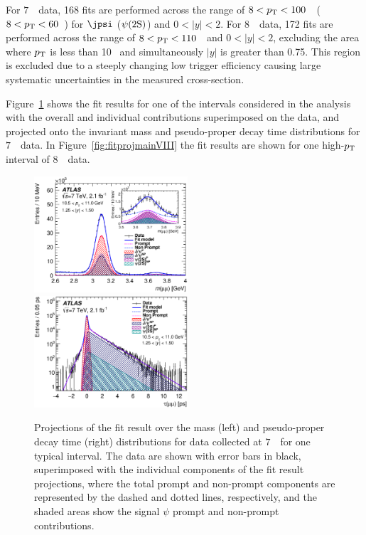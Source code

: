 For $7$~\TeV\ data, 168 fits are performed across the range of $8<\mbox{$p_{\text{T}}$}<100$~\GeV\ ($8<\mbox{$p_{\text{T}}$}<60$~\GeV) for $\jpsi$ ($\psi(2\mathrm{S})$) and $0<|y|<2$.
For $8$~\TeV\ data, 172 fits are performed across the range of $8<\mbox{$p_{\text{T}}$}<110$~\GeV\ and $0<|y|<2$,
excluding the area where $\mbox{$p_{\text{T}}$}$ is less than 10 \GeV\ and simultaneously $|y|$ is
greater than 0.75. This region is excluded due to a steeply changing low trigger efficiency 
causing large systematic uncertainties in the measured cross-section.

Figure~\ref{fig:fitprojmain} shows the fit results for one of the intervals considered in the analysis with the overall and individual contributions superimposed on the data, and projected onto the invariant mass and pseudo-proper decay time distributions for  $7$~\TeV\ data.
In Figure~\ref{fig:fitprojmainVIII} the fit results are shown for one high-$\mbox{$p_{\text{T}}$}$ interval of $8$~\TeV\  data.

\begin{figure} [!ht]
  \begin{center} 
   \includegraphics[width=0.51\textwidth]{figures/c_c_Mass_5_5.eps}
   \hspace{-0.55cm}
   \includegraphics[width=0.51\textwidth]{figures/c_c_Tau_5_5.eps}
      \caption{Projections of the fit result over the mass (left) and pseudo-proper decay time (right) distributions for data collected at $7$~\TeV\  for one typical interval. The data are shown with error bars in black, superimposed with the individual components of the fit result projections, where the total prompt and non-prompt components are represented by the dashed and dotted lines, respectively, and the shaded areas show the signal $\psi$ prompt and non-prompt contributions.\label{fig:fitprojmain}}
  \end{center}
\end{figure} 

